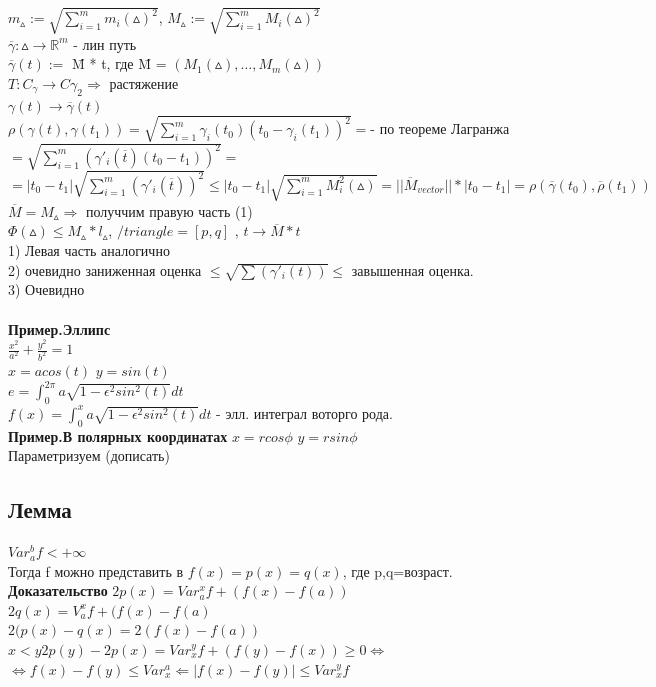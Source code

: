 \documentclass[12pt, a4paper]{article}
\newcommand{\nl}{\newline}
\begin{document}
	$m_\vartriangle := \sqrt{\sum_{i=1}^m m_i(\vartriangle)^2}$,   
	$M_\vartriangle:=\sqrt{\sum_{i=1}^m M_i(\vartriangle)^2} $\\
	$ \overline\gamma : \vartriangle \rightarrow \mathbb{R}^m$ - лин путь \\
	$\overline\gamma(t):=$ \=M * t, где \=M = $(M_1(\vartriangle),\dots,M_m(\vartriangle))$ \\
	$T:C_\gamma \rightarrow C \gamma_2 \Rightarrow$ растяжение \\
	$\gamma(t) \rightarrow \overline\gamma(t)$ \\
	$\rho(\gamma(t),\gamma(t_1))=\sqrt{\sum_{i=1}^{m}\gamma_i({ t_0})(t_0-\gamma_i(t_1))^2}=$- по теореме Лагранжа\\
	$=\sqrt{\sum_{i=1}^{m}(\gamma'_i(\overline t)(t_0 - t_1))^2} = $
	$=|t_0 -t_1|\sqrt{\sum_{i=1}^{m}(\gamma'_i(\overline t))^2} \leq |t_0 - t_1| \sqrt{\sum_{i=1}^{m}M_{i}^2(\vartriangle)} = ||\overline M_{vector}||*|t_0 - t_1| = \rho(\overline \gamma(t_0),\overline\rho(t_1))$\\
	$\overline M = M_{\vartriangle} \Rightarrow$ получчим правую часть (1)\\
	$\Phi(\vartriangle)\leq M_\vartriangle * l_\vartriangle$,   $/triangle =[p,q]$ ,   $t \rightarrow \overline M*t$ \\
	
	1) Левая часть аналогично\\
	2) очевидно  заниженная оценка $\leq \sqrt{\sum(\gamma'_i(t))}\leq$ завышенная оценка.\\
	3) Очевидно\\
	\\
	\textbf{Пример.Эллипс}\\
	$\frac{x^2}{a^2}+\frac{y^2}{b^2}=1$\\
	$x= a cos(t)$  $y=sin(t)$ \\
	$e=\int_{0}^{2\pi}a\sqrt{1-\epsilon^2 sin^2(t)}dt$\\
	$f(x)=\int_{0}^{x}a\sqrt{1-\epsilon^2 sin^2(t)}dt$ - элл. интеграл воторго рода.\\
	\textbf{Пример.В полярных координатах} \nl
	$x=rcos\phi$  $y=rsin\phi$\\
	Параметризуем (дописать)
	\subsection{Лемма}
	$Var_{a}^{b} f < +\infty$\\
	Тогда f можно представить в  $f(x)=p(x)=q(x)$, где  p,q=возраст.\\
	\textbf{Доказательство}\nl
	$2 p(x)= Var_{a}^{x}f +(f(x)-f(a))$\\
	$2 q(x)= V_{a}^{x}f +(f(x)-f(a)$\\
	$2(p(x)-q(x) =2(f(x)-f(a))$\\
	$x < y 2p(y)-2p(x) = Var_{x}^{y}f+(f(y)-f(x))\geq0\Longleftrightarrow$\\
	$\Longleftrightarrow f(x) - f(y)\leq Var_{x}^{a} \Leftarrow |f(x)-f(y)|\leq  Var_{x}^{y}f$  
	
\end{document}
